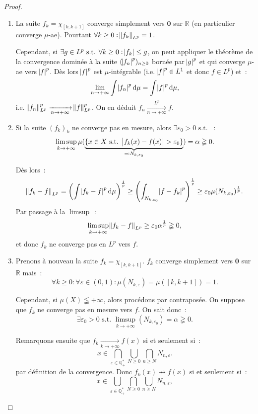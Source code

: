 \documentclass{article}
\newcommand{\pinfty}{{+\infty}}
\newcommand{\st}{\text{ s.t. }}
\newcommand{\Q}{{\mathbb Q}}
\newcommand{\R}{{\mathbb R}}
\begin{document}
\begin{proof}~
\begin{enumerate}
	\item La suite $f_k = \chi_{[k, k+1]}$ converge simplement vers $\mathbf 0$ sur $\R$ (en particulier converge $\mu$-ae). Pourtant $\forall k \geq 0 : \norm {f_k}_{L^p} = 1$.

	Cependant, si $\exists g \in L^p \st \forall k \geq 0 : \abs {f_k} \leq g$, on peut appliquer le théorème de la convergence dominée à la suite $(\abs {f_n}^p)_{n \geq 0}$
	bornée par $\abs g^p$ et qui converge $\mu$-ae vers $\abs f^p$. Dès lors $\abs f^p$ est $\mu$-intégrable (i.e. $\abs f^p \in L^1$ et donc $f \in L^p$) et~:
	\[\lim_{n \to \pinfty}\int \abs {f_n}^p\dif\mu = \int \abs f^p\dif\mu,\]
	i.e. $\norm {f_n}_{L^p}^p \xrightarrow[n \to \pinfty]{} \norm f_{L^p}^p$. On en déduit $f_n \xrightarrow[n \to \pinfty]{L^p} f$.

	\item Si la suite $(f_k)_k$ ne converge pas en mesure, alors $\exists \varepsilon_0 > 0 \st$~:
	\[\limsup_{k \to \pinfty}\mu(\underbrace {\{x \in X \st \abs {f_k(x)-f(x)} > \varepsilon_0\}}_{\eqqcolon N_{k,\varepsilon_0}}) = \alpha \gneqq 0.\]

	Dès lors~:
	\[\norm {f_k-f}_{L^p} = \left(\int\abs {f_k-f}^p\dif\mu\right)^{\frac 1p} \geq \left(\int_{N_{k,\varepsilon_0}}\abs {f-f_k}^p\right)^{\frac 1p}
	\geq \varepsilon_0\mu(N_{k,\varepsilon_0})^{\frac 1p}.\]
	Par passage à la $\limsup$~:
	\[\limsup_{k \to \pinfty}\norm {f_k-f}_{L^p} \geq \varepsilon_0\alpha^{\frac 1p} \gneqq 0,\]
	et donc $f_k$ ne converge pas en $L^p$ vers $f$.

	\item Prenons à nouveau la suite $f_k = \chi_{[k, k+1]}$. $f_k$ converge simplement vers $\mathbf 0$ sur $\R$ mais~:
	\[\forall k \geq 0 : \forall \varepsilon \in (0, 1) : \mu(N_{k,\varepsilon}) = \mu([k, k+1]) = 1.\]

	Cependant, si $\mu(X) \lneqq \pinfty$, alors procédons par contraposée. On suppose que $f_k$ ne converge pas en mesure vers $f$. On sait donc~:
	\[\exists \varepsilon_0 > 0 \st \limsup_{k \to \pinfty}(N_{k,\varepsilon_0}) = \alpha \gneqq 0.\]

	Remarquons ensuite que $f_k \xrightarrow[k \to \pinfty]{} f(x)$ si et seulement si~:
	\[x \in \bigcap_{\varepsilon \in \Q_+^*}\bigcup_{N \geq 0}\bigcap_{n \geq N}N_{n,\varepsilon}.\]
	par définition de la convergence. Donc $f_k(x) \not \to f(x)$ si et seulement si~:
	\[x \in \bigcup_{\varepsilon \in \Q_+^*}\bigcap_{N \geq 0}\bigcup_{n \geq N}N_{n,\varepsilon},\]


\end{enumerate}
\end{proof}
\end{document}
